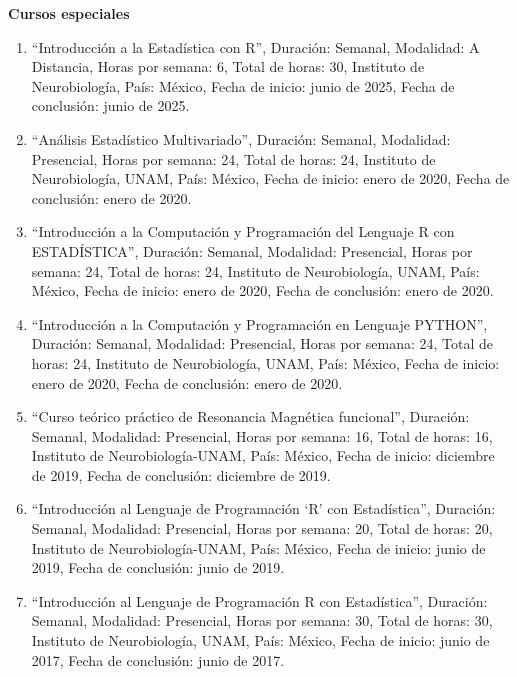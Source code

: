 \textbf{Cursos especiales}

\begin{enumerate}

\item “Introducción a la Estadística con R”, Duración: Semanal, Modalidad: A Distancia, Horas por semana: 6, Total de horas: 
30, 
Instituto de Neurobiología, País: México, Fecha de inicio: junio de 2025, Fecha de conclusión: junio de 2025.

\item “Análisis Estadístico Multivariado”, Duración: Semanal, Modalidad: Presencial, Horas por semana: 24, Total de horas: 
24, 
Instituto de Neurobiología, UNAM, País: México, Fecha de inicio: enero de 2020, Fecha de conclusión: enero de 2020.

\item “Introducción a la Computación y Programación del Lenguaje R con ESTADÍSTICA”, Duración: Semanal, Modalidad: 
Presencial, 
Horas por semana: 24, Total de horas: 24, Instituto de Neurobiología, UNAM, País: México, Fecha de inicio: enero de 2020, 
Fecha de conclusión: enero de 2020.

\item “Introducción a la Computación y Programación en Lenguaje PYTHON”, Duración: Semanal, Modalidad: Presencial, Horas por 
semana: 24, Total de horas: 24, Instituto de Neurobiología, UNAM, País: México, Fecha de inicio: enero de 2020, Fecha de 
conclusión: enero de 2020.

\item “Curso teórico práctico de Resonancia Magnética funcional”, Duración: Semanal, Modalidad: Presencial, Horas por semana: 
16, Total de horas: 16, Instituto de Neurobiología-UNAM, País: México, Fecha de inicio: diciembre de 2019, Fecha de 
conclusión: diciembre de 2019.

\item “Introducción al Lenguaje de Programación ‘R’ con Estadística”, Duración: Semanal, Modalidad: Presencial, Horas por 
semana: 20, Total de horas: 20, Instituto de Neurobiología-UNAM, País: México, Fecha de inicio: junio de 2019, Fecha de 
conclusión: junio de 2019.

\item “Introducción al Lenguaje de Programación R con Estadística”, Duración: Semanal, Modalidad: Presencial, Horas por 
semana: 
30, Total de horas: 30, Instituto de Neurobiología, UNAM, País: México, Fecha de inicio: junio de 2017, Fecha de conclusión: 
junio de 2017.


\end{enumerate}
